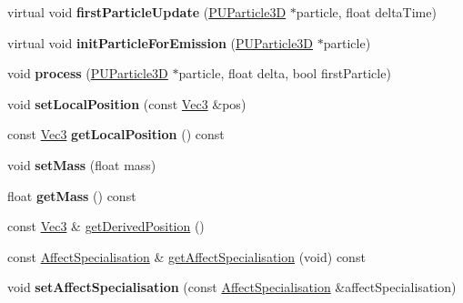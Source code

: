 \begin{DoxyCompactItemize}
\item 
\mbox{\label{classPUAffector_acb7f0b770d4b0c28983a3a5aa46ddc61}} 
virtual void {\bfseries first\+Particle\+Update} (\hyperlink{structPUParticle3D}{P\+U\+Particle3D} $\ast$particle, float delta\+Time)
\item 
\mbox{\label{classPUAffector_a9271fbf810592c2bf7d1604b8f4f1368}} 
virtual void {\bfseries init\+Particle\+For\+Emission} (\hyperlink{structPUParticle3D}{P\+U\+Particle3D} $\ast$particle)
\item 
\mbox{\label{classPUAffector_a271c772062f40b7ae17eb660f47bd34c}} 
void {\bfseries process} (\hyperlink{structPUParticle3D}{P\+U\+Particle3D} $\ast$particle, float delta, bool first\+Particle)
\item 
\mbox{\label{classPUAffector_a32e6aaf7374728bd1c65e90f969178a4}} 
void {\bfseries set\+Local\+Position} (const \hyperlink{classVec3}{Vec3} \&pos)
\item 
\mbox{\label{classPUAffector_ad49591d80bfbed0caf3899456b67f233}} 
const \hyperlink{classVec3}{Vec3} {\bfseries get\+Local\+Position} () const
\item 
\mbox{\label{classPUAffector_a191d219a3602625008064b5fa20e21ad}} 
void {\bfseries set\+Mass} (float mass)
\item 
\mbox{\label{classPUAffector_a2422d91e069a09b3ff66efe7afff13b2}} 
float {\bfseries get\+Mass} () const
\item 
const \hyperlink{classVec3}{Vec3} \& \hyperlink{classPUAffector_aefcd7042173aba9533a02ff82f4cae44}{get\+Derived\+Position} ()
\item 
const \hyperlink{classPUAffector_aa4e8045ac29ee020895fd3e386935013}{Affect\+Specialisation} \& \hyperlink{classPUAffector_a96326f08d83ecd04391412acf9642dd5}{get\+Affect\+Specialisation} (void) const
\item 
\mbox{\label{classPUAffector_a01ac5c5a60f7ed1ef22d97665808cf5b}} 
void {\bfseries set\+Affect\+Specialisation} (const \hyperlink{classPUAffector_aa4e8045ac29ee020895fd3e386935013}{Affect\+Specialisation} \&affect\+Specialisation)

\end{DoxyCompactItemize}

